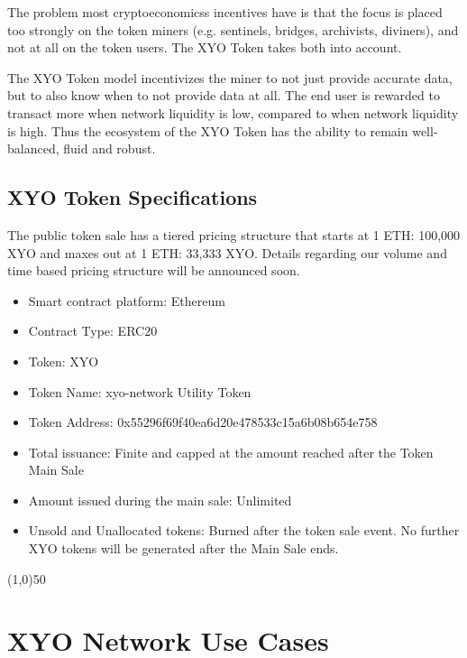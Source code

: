\documentclass{article}
\begin{document}
The problem most \glspl{cryptoeconomics} incentives have is that the focus is placed too strongly on the token miners (e.g. \Glspl{sentinel}, \Glspl{bridge}, \Glspl{archivist}, \Glspl{diviner}), and not at all on the token users. The XYO Token takes both into account.

The XYO Token model incentivizes the miner to not just provide accurate data, but to also know when to not provide data at all. The end user is rewarded to transact more when network liquidity is low, compared to when network liquidity is high. Thus the ecosystem of the XYO Token has the ability to remain well-balanced, fluid and robust.

\subsection {XYO Token Specifications}
The public token sale has a tiered pricing structure that starts at 1 ETH: 100,000 XYO and maxes out at 1 ETH: 33,333 XYO. Details regarding our volume and time based pricing structure will be announced soon.
\begin{itemize}
\item Smart contract platform: Ethereum
\item Contract Type: ERC20
\item Token: XYO
\item Token Name: \Gls{xyo-network} Utility Token
\item Token Address: 0x55296f69f40ea6d20e478533c15a6b08b654e758
\item Total issuance: Finite and capped at the amount reached after the Token Main Sale
\item Amount issued during the main sale: Unlimited
\item Unsold and Unallocated tokens: Burned after the token sale event. No further XYO tokens will be generated after the Main Sale ends.
\end{itemize}

\begin{center}
\line(1,0){50}
\end{center}

\section{XYO Network Use Cases}
\end{document}
